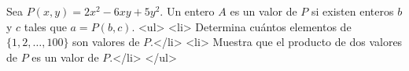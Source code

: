 Sea $P(x,y)=2x^2-6xy+5y^2$. Un entero $A$ es un valor de $P$ si existen enteros $b$ y $c$ tales que $a=P(b,c)$.
<ul>
<li> Determina cuántos elementos de $\{1,2,\dots,100\}$ son valores de $P$.</li>
<li> Muestra que el producto de dos valores de $P$ es un valor de $P$.</li>
</ul>